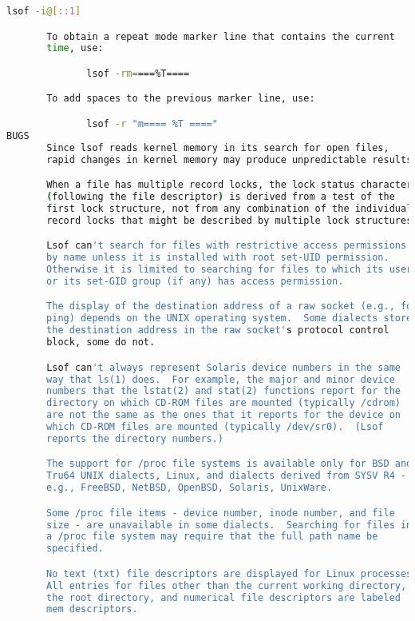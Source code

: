 {{\begin{lstlisting}[language=bash]
              lsof -i@[::1]

       To obtain a repeat mode marker line that contains the current
       time, use:

              lsof -rm====%T====

       To add spaces to the previous marker line, use:

              lsof -r "m==== %T ===="
BUGS
       Since lsof reads kernel memory in its search for open files,
       rapid changes in kernel memory may produce unpredictable results.

       When a file has multiple record locks, the lock status character
       (following the file descriptor) is derived from a test of the
       first lock structure, not from any combination of the individual
       record locks that might be described by multiple lock structures.

       Lsof can't search for files with restrictive access permissions
       by name unless it is installed with root set-UID permission.
       Otherwise it is limited to searching for files to which its user
       or its set-GID group (if any) has access permission.

       The display of the destination address of a raw socket (e.g., for
       ping) depends on the UNIX operating system.  Some dialects store
       the destination address in the raw socket's protocol control
       block, some do not.

       Lsof can't always represent Solaris device numbers in the same
       way that ls(1) does.  For example, the major and minor device
       numbers that the lstat(2) and stat(2) functions report for the
       directory on which CD-ROM files are mounted (typically /cdrom)
       are not the same as the ones that it reports for the device on
       which CD-ROM files are mounted (typically /dev/sr0).  (Lsof
       reports the directory numbers.)

       The support for /proc file systems is available only for BSD and
       Tru64 UNIX dialects, Linux, and dialects derived from SYSV R4 -
       e.g., FreeBSD, NetBSD, OpenBSD, Solaris, UnixWare.

       Some /proc file items - device number, inode number, and file
       size - are unavailable in some dialects.  Searching for files in
       a /proc file system may require that the full path name be
       specified.

       No text (txt) file descriptors are displayed for Linux processes.
       All entries for files other than the current working directory,
       the root directory, and numerical file descriptors are labeled
       mem descriptors.


\end{lstlisting}}}
